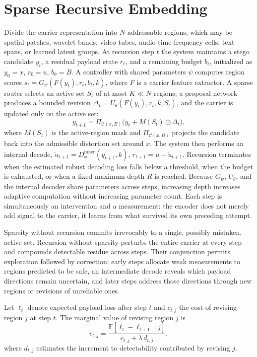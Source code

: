 \section{Sparse Recursive Embedding}

Divide the carrier representation into $N$ addressable regions, which may be spatial patches, wavelet bands, video tubes, audio time-frequency cells, text spans, or learned latent groups. At recursion step $t$ the system maintains a stego candidate $y_t$, a residual payload state $r_t$, and a remaining budget $b_t$, initialized as $y_0 = x$, $r_0 = u$, $b_0 = B$. A controller with shared parameters $\psi$ computes region scores $s_t = G_\psi(F(y_t), r_t, b_t, k)$, where $F$ is a carrier feature extractor. A sparse router selects an active set $S_t$ of at most $K \ll N$ regions; a proposal network produces a bounded revision $\Delta_t = U_\theta(F(y_t), r_t, k, S_t)$, and the carrier is updated only on the active set:
\[
y_{t+1} = \Pi_{\mathcal{C}(x,B)}\bigl(y_t + M(S_t) \odot \Delta_t\bigr),
\]
where $M(S_t)$ is the active-region mask and $\Pi_{\mathcal{C}(x,B)}$ projects the candidate back into the admissible distortion set around $x$. The system then performs an internal decode, $\tilde u_{t+1} = D_\phi^{\mathrm{inner}}(y_{t+1}, k)$, $r_{t+1} = u - \tilde u_{t+1}$. Recursion terminates when the estimated robust decoding loss falls below a threshold, when the budget is exhausted, or when a fixed maximum depth $R$ is reached. Because $G_\psi$, $U_\theta$, and the internal decoder share parameters across steps, increasing depth increases adaptive computation without increasing parameter count. Each step is simultaneously an intervention and a measurement: the encoder does not merely add signal to the carrier, it learns from what survived its own preceding attempt.

Sparsity without recursion commits irrevocably to a single, possibly mistaken, active set. Recursion without sparsity perturbs the entire carrier at every step and compounds detectable residue across steps. Their conjunction permits exploration followed by correction: early steps allocate weak measurements to regions predicted to be safe, an intermediate decode reveals which payload directions remain uncertain, and later steps address those directions through new regions or revisions of unreliable ones.

\begin{definition}
Let $\ell_t$ denote expected payload loss after step $t$ and $c_{t,j}$ the cost of revising region $j$ at step $t$. The marginal value of revising region $j$ is
\[
v_{t,j} = \frac{\mathbb{E}[\ell_t - \ell_{t+1} \mid j]}{c_{t,j} + \lambda\, d_{t,j}},
\]
where $d_{t,j}$ estimates the increment to detectability contributed by revising $j$.
\end{definition}

